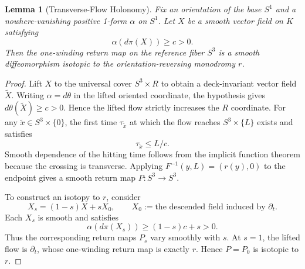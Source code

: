 \documentclass[11pt]{article}
\theoremstyle{canonmath}
\newtheorem{lemma}[theorem]{Lemma}
\theoremstyle{canonpostulate}
\theoremstyle{canonproposition}
\providecommand{\Klein}{\mathcal{K}}
\providecommand{\R}{\mathbb{R}}
\providecommand{\Sone}{S^1}
\providecommand{\Sthree}{S^3}
\def\mathbb#1{#1}%
\def\mathcal#1{#1}%
\begin{document}
\begin{lemma}[Transverse-Flow Holonomy] \label{lem:holonomy}
Fix an orientation of the base $\Sone$ and a nowhere-vanishing positive 1-form $\alpha$ on $\Sone$. Let $X$ be a smooth vector field on $\Klein$ satisfying
\[
\alpha(d\pi(X))\ge c>0.
\]
Then the one-winding return map on the reference fiber $\Sthree$ is a smooth diffeomorphism isotopic to the orientation-reversing monodromy $r$.
\end{lemma}
\begin{proof}
Lift $X$ to the universal cover $\Sthree\times\R$ to obtain a deck-invariant vector field $\widetilde X$. Writing $\alpha=d\theta$ in the lifted oriented coordinate, the hypothesis gives $d\theta(\widetilde X)\ge c>0$. Hence the lifted flow strictly increases the $\R$ coordinate. For any $\tilde x\in\Sthree\times\{0\}$, the first time $\tau_{\tilde x}$ at which the flow reaches $\Sthree\times\{L\}$ exists and satisfies
\[
\tau_{\tilde x}\le L/c.
\]
Smooth dependence of the hitting time follows from the implicit function theorem because the crossing is transverse. Applying $F^{-1}(y,L)=(r(y),0)$ to the endpoint gives a smooth return map $P:\Sthree\to\Sthree$.

To construct an isotopy to $r$, consider
\[
X_s=(1-s)X+sX_0,
\qquad
X_0:=\text{the descended field induced by }\partial_t.
\]
Each $X_s$ is smooth and satisfies
\[
\alpha(d\pi(X_s))\ge (1-s)c+s>0.
\]
Thus the corresponding return maps $P_s$ vary smoothly with $s$. At $s=1$, the lifted flow is $\partial_t$, whose one-winding return map is exactly $r$. Hence $P=P_0$ is isotopic to $r$.
\end{proof}
\end{document}
